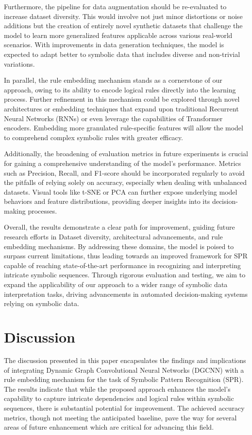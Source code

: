 \documentclass{article}
\begin{document}
Furthermore, the pipeline for data augmentation should be re-evaluated to increase dataset diversity. This would involve not just minor distortions or noise additions but the creation of entirely novel synthetic datasets that challenge the model to learn more generalized features applicable across various real-world scenarios. With improvements in data generation techniques, the model is expected to adapt better to symbolic data that includes diverse and non-trivial variations.

In parallel, the rule embedding mechanism stands as a cornerstone of our approach, owing to its ability to encode logical rules directly into the learning process. Further refinement in this mechanism could be explored through novel architectures or embedding techniques that expand upon traditional Recurrent Neural Networks (RNNs) or even leverage the capabilities of Transformer encoders. Embedding more granulated rule-specific features will allow the model to comprehend complex symbolic rules with greater efficacy.

Additionally, the broadening of evaluation metrics in future experiments is crucial for gaining a comprehensive understanding of the model’s performance. Metrics such as Precision, Recall, and F1-score should be incorporated regularly to avoid the pitfalls of relying solely on accuracy, especially when dealing with unbalanced datasets. Visual tools like t-SNE or PCA can further expose underlying model behaviors and feature distributions, providing deeper insights into its decision-making processes.

Overall, the results demonstrate a clear path for improvement, guiding future research efforts in Dataset diversity, architectural advancements, and rule embedding mechanisms. By addressing these domains, the model is poised to surpass current limitations, thus leading towards an improved framework for SPR capable of reaching state-of-the-art performance in recognizing and interpreting intricate symbolic sequences. Through rigorous evaluation and testing, we aim to expand the applicability of our approach to a wider range of symbolic data interpretation tasks, driving advancements in automated decision-making systems relying on symbolic data.
\section{Discussion}
The discussion presented in this paper encapsulates the findings and implications of integrating Dynamic Graph Convolutional Neural Networks (DGCNN) with a rule embedding mechanism for the task of Symbolic Pattern Recognition (SPR). The results indicate that while the proposed approach enhances the model's capability to capture intricate dependencies and logical rules within symbolic sequences, there is substantial potential for improvement. The achieved accuracy metrics, though not meeting the anticipated baseline, pave the way for several areas of future enhancement which are critical for advancing this field.
\end{document}

